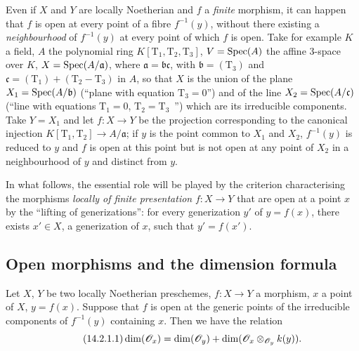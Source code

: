 \begin{remark}[14.1.5]
\label{IV.14.1.5}
Even if $X$ and $Y$ are locally Noetherian and $f$ a \emph{finite} morphism, it can happen that $f$ is open at every point of a fibre $f^{-1}(y)$, without there existing a \emph{neighbourhood} of $f^{-1}(y)$ at every point of which $f$ is open.
Take for example $K$ a field, $A$ the polynomial ring $K[\mathrm{T}_1,\mathrm{T}_2,\mathrm{T}_3]$, $V=\operatorname{Spec}(A)$ the affine $3$-space over $K$, $X=\operatorname{Spec}(A/\mathfrak{a})$, where $\mathfrak{a}=\mathfrak{b}\mathfrak{c}$, with $\mathfrak{b}=(\mathrm{T}_3)$ and $\mathfrak{c}=(\mathrm{T}_1)+(\mathrm{T}_2-\mathrm{T}_3)$ in $A$, so that $X$ is the union of the plane $X_1=\operatorname{Spec}(A/\mathfrak{b})$ (``plane with equation $\mathrm{T}_3=0$'') and of the line $X_2=\operatorname{Spec}(A/\mathfrak{c})$ (``line with equations $\mathrm{T}_1=0$, $\mathrm{T}_2=\mathrm{T}_3$~'') which are its irreducible components.
Take $Y=X_1$ and let $f:X\to Y$ be the projection corresponding to the canonical injection $K[\mathrm{T}_1,\mathrm{T}_2]\to A/\mathfrak{a}$; if $y$ is the point common to $X_1$ and $X_2$, $f^{-1}(y)$ is reduced to $y$ and $f$ is open at this point but is not open at any point of $X_2$ in a neighbourhood of $y$ and distinct from $y$.
\end{remark}

\begin{env}[14.1.6]
\label{IV.14.1.6}
In what follows, the essential role will be played by the criterion  characterising the morphisms \emph{locally of finite presentation} $f:X\to Y$ that are open at a point $x$ by the ``lifting of generizations'': for every generization $y'$ of $y=f(x)$, there exists $x'\in X$, a generization of $x$, such that $y'=f(x')$.
\end{env}

\subsection{Open morphisms and the dimension formula}
\label{subsection:IV.14.2}

\begin{theorem}[14.2.1]
\label{IV.14.2.1}
Let $X$, $Y$ be two locally Noetherian preschemes, $f:X\to Y$ a morphism, $x$ a point of $X$, $y=f(x)$.
Suppose that $f$ is open at the generic points of the irreducible components of $f^{-1}(y)$ containing $x$.
Then we have the relation
\begin{equation}
\tag{14.2.1.1}
\label{IV.14.2.1.1}
  \dim(\mathscr{O}_x)=\dim(\mathscr{O}_y)+\dim(\mathscr{O}_x\otimes_{\mathscr{O}_y}k(y)).
\end{equation}
\end{theorem}

